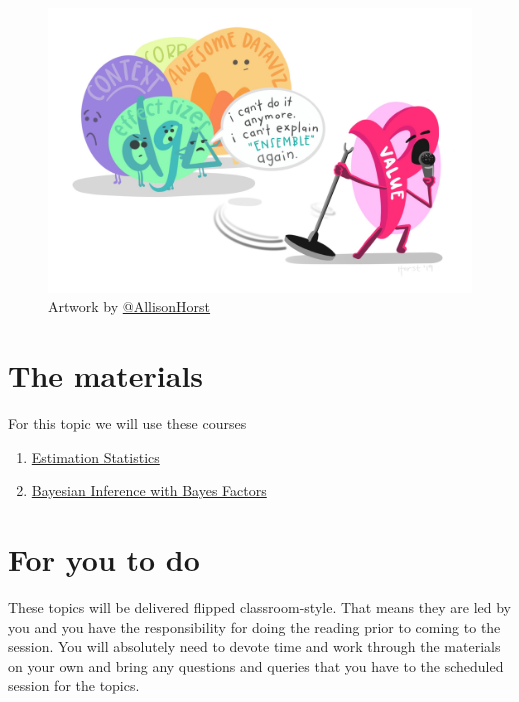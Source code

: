 \documentclass[
]{book}
\providecommand{\tightlist}{%
  \setlength{\itemsep}{0pt}\setlength{\parskip}{0pt}}
\begin{document}
\begin{figure}
\centering
\includegraphics{p_value_mic_hog.jpg}
\caption{\label{fig:unnamed-chunk-7}Artwork by \href{https://github.com/allisonhorst}{@AllisonHorst}}
\end{figure}

\hypertarget{the-materials-3}{%
\section{The materials}\label{the-materials-3}}

For this topic we will use these courses

\begin{enumerate}
\def\labelenumi{\arabic{enumi}.}
\tightlist
\item
  \href{https://danmaclean.github.io/estimation_statistics/}{Estimation Statistics}
\item
  \href{https://danmaclean.github.io/bayes_factors/}{Bayesian Inference with Bayes Factors}
\end{enumerate}

\hypertarget{for-you-to-do-3}{%
\section{For you to do}\label{for-you-to-do-3}}

These topics will be delivered flipped classroom-style. That means they are led by you and you have the responsibility for doing the reading prior to coming to the session. You will absolutely need to devote time and work through the materials on your own and bring any questions and queries that you have to the scheduled session for the topics.
\end{document}
